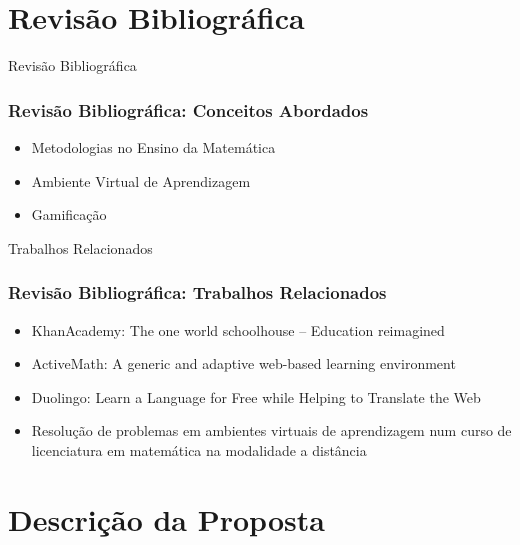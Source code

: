 \documentclass[aspectratio=169]{beamer}
\begin{document}
\section{Revisão Bibliográfica}

\begin{frame}{Revisão Bibliográfica}
\frametitle{Revisão Bibliográfica: Conceitos Abordados}

\begin{itemize}
	\item Metodologias no Ensino da Matemática
	\item Ambiente Virtual de Aprendizagem
	\item Gamifica\c{c}\~ao
\end{itemize}

\end{frame}

\begin{frame}{Trabalhos Relacionados}
\frametitle{Revisão Bibliográfica: Trabalhos Relacionados}

\begin{itemize}
	\item KhanAcademy: The one world schoolhouse -- Education reimagined
	\item ActiveMath: A generic and adaptive web-based learning environment
	\item Duolingo: Learn a Language for Free while Helping to Translate the Web
	\item Resolução de problemas em ambientes virtuais de aprendizagem num curso de licenciatura em matemática na modalidade a distância
\end{itemize}

\end{frame}

\section{Descrição da Proposta}

\setcounter{figure}{0}
\end{document}
